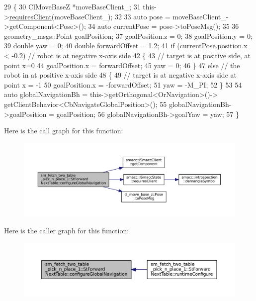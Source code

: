 \begin{DoxyCode}
29     \{
30       ClMoveBaseZ *moveBaseClient\_;
31       this->\hyperlink{classsmacc_1_1ISmaccState_a7f95c9f0a6ea2d6f18d1aec0519de4ac}{requiresClient}(moveBaseClient\_);
32 
33       \textcolor{keyword}{auto} pose = moveBaseClient\_->getComponent<Pose>();
34       \textcolor{keyword}{auto} currentPose = pose->toPoseMsg();
35 
36       geometry\_msgs::Point goalPosition;
37       goalPosition.z = 0;
38       goalPosition.y = 0;
39       \textcolor{keywordtype}{double} yaw = 0;
40       \textcolor{keywordtype}{double} forwardOffset = 1.2;
41       \textcolor{keywordflow}{if} (currentPose.position.x < -0.2) \textcolor{comment}{// robot is at negative x-axis side}
42       \{
43         \textcolor{comment}{// target is at positive side, at point x=0}
44         goalPosition.x = forwardOffset;
45         yaw = 0;
46       \}
47       \textcolor{keywordflow}{else} \textcolor{comment}{// the robot in at positive x-axis side}
48       \{
49         \textcolor{comment}{// target is at negative x-axis side at point x = -1}
50         goalPosition.x = -forwardOffset;
51         yaw = -M\_PI;
52       \}
53 
54       \textcolor{keyword}{auto} globalNavigationBh = this->getOrthogonal<OrNavigation>()->
      getClientBehavior<CbNavigateGlobalPosition>();
55       globalNavigationBh->goalPosition = goalPosition;
56       globalNavigationBh->goalYaw = yaw;
57     \}
\end{DoxyCode}
Here is the call graph for this function\+:
\nopagebreak
\begin{figure}[H]
\begin{center}
\leavevmode
\includegraphics[width=350pt]{structsm__fetch__two__table__pick__n__place__1_1_1StForwardNextTable_a7b7d04ab57af4686b394afda86c891af_cgraph}
\end{center}
\end{figure}
Here is the caller graph for this function\+:
\nopagebreak
\begin{figure}[H]
\begin{center}
\leavevmode
\includegraphics[width=350pt]{structsm__fetch__two__table__pick__n__place__1_1_1StForwardNextTable_a7b7d04ab57af4686b394afda86c891af_icgraph}
\end{center}
\end{figure}
